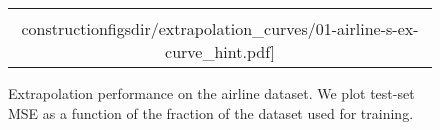 \begin{figure}
\centering
\begin{tabular}{c}
\hspace{-0.5cm} \texttt{[image: \\constructionfigsdir/extrapolation\_curves/01-airline-s-ex-curve\_hint.pdf]}
\end{tabular}
\caption{Extrapolation performance on the airline dataset.  We plot test-set MSE as a function of the fraction of the dataset used for training. 
}
\label{fig:extrapolation}
\end{figure}
